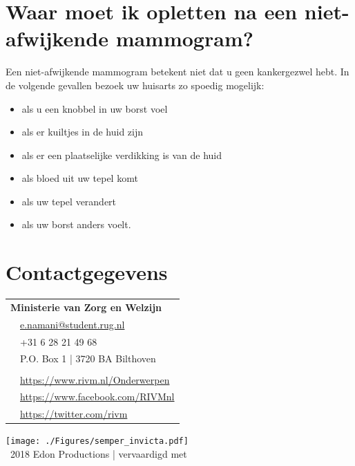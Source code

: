 \documentclass[a4paper,notumble]{leaflet}
\begin{document}

\section{Waar moet ik opletten na een niet-afwijkende mammogram?}
Een niet-afwijkende mammogram betekent niet dat u geen kankergezwel hebt. In de volgende gevallen bezoek uw huisarts zo spoedig mogelijk:
\begin{itemize}
	\item als u een knobbel in uw borst voel
	\item als er kuiltjes in de huid zijn
	\item als er een plaatselijke verdikking is van de huid
	\item als bloed uit uw tepel komt
	\item als uw tepel verandert
	\item als uw borst anders voelt.
\end{itemize}

\section{Contactgegevens}
\begin{tabular}{cl}
	\multicolumn{2}{l}{\bf Ministerie van Zorg en Welzijn}\\
	\faEnvelope & \href{mailto:e.namani@student.rug.nl}{e.namani@student.rug.nl}\\
	\faPhone & +31 6 28 21 49 68\\
	\faMapMarker & P.O. Box 1 | 3720 BA Bilthoven \\
	\\
	\faChain & \url{https://www.rivm.nl/Onderwerpen}\\
	\faFacebookOfficial & \url{https://www.facebook.com/RIVMnl}\\
	\faTwitter & \url{https://twitter.com/rivm}\\
\end{tabular}
\newpage
\phantom{hoi}
\vfill
\begin{center}
	\texttt{[image: ./Figures/semper\_invicta.pdf]}\\[\baselineskip]
\footnotesize{
		\textcopyright\ 2018 Edon Productions |
		    	vervaardigd met \LaTeXe
			        }
\end{center}
\end{document}
